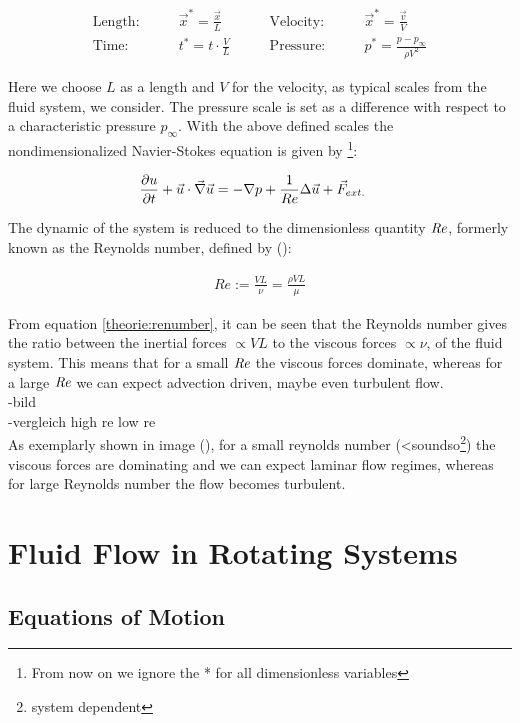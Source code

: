 \begin{align}
    \text{Length:}\qquad &  \vec{x}^* = \frac{\vec{x}}{L}  & \qquad \text{Velocity:}\qquad& \vec{x}^* = \frac{\vec{v}}{V}\\
    \text{Time:}  \qquad & t^* = t \cdot \frac{V}{L}      & \qquad  \text{Pressure:}\qquad & p^* = \frac{p - p_\infty}{\rho V^2}
\end{align}

Here we choose $L$ as a length and $V$ for the velocity, as typical scales from the fluid system, we consider.
The pressure scale is set as a difference with respect to a characteristic pressure $p_\infty$.
With the above defined scales the nondimensionalized Navier-Stokes equation is given by \footnote{
From now on we ignore the * for all dimensionless variables }:

\begin{align}
    \pdn[u]{t} + \vec{u} \cdot \vec{\nabla} \vec{u} &= -\nabla p + \frac{1}{Re} \Delta \vec{u} + \vec{F}_{ext.}
\end{align}

The dynamic of the system is reduced to the dimensionless quantity $\Rey$, formerly known as the Reynolds number,
defined by (\citep{Kundu2012}):

\begin{align}
    \label{theorie:renumber}
    Re := \frac{VL}{\nu} = \frac{\rho VL}{\mu}
\end{align}

From equation \ref{theorie:renumber}, it can be seen that the Reynolds number gives the ratio between the inertial forces $\propto VL$
to the viscous forces $\propto \nu$, of the fluid system.
This means that for a small $\Rey$ the viscous forces dominate, whereas for a large $\Rey$ we can expect advection driven, maybe even turbulent flow.\\
-bild\\
-vergleich high re low re \\
As exemplarly shown in image (),  for a small reynolds number (<soundso\footnote{system dependent})  the viscous forces are dominating and we can expect laminar flow regimes, whereas for
large Reynolds number the flow becomes turbulent.

\newpage

\section{Fluid Flow in Rotating Systems}
\subsection{Equations of Motion}

